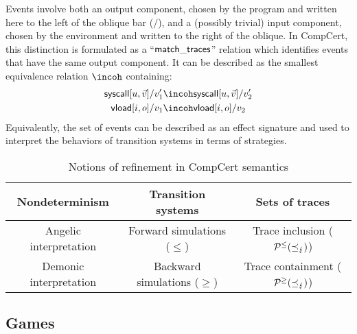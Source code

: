 \documentclass[sigplan,10pt,authordraft]{acmart}
\begin{document}
Events involve both an output component,
chosen by the program and
written here to the left of the oblique bar ($/$),
and a (possibly trivial) input component,
chosen by the environment and written to the right of the oblique.
In CompCert,
this distinction is formulated as a ``$ \mathsf{match\_traces} $'' relation
which identifies events that have the same output component.
It can be described as the smallest equivalence relation $\incoh$
containing:
\begin{align*}
  \kw{syscall}[u, \vec{v}]/v_1' &\incoh
  \kw{syscall}[u, \vec{v}]/v_2'
  \\
  \kw{vload}[i, o]/v_1 &\incoh
  \kw{vload}[i, o]/v_2
\end{align*}
Equivalently,
the set of events can be described as an effect signature
and used to interpret the behaviors of transition systems
in terms of strategies.


\begin{table*} %
  \caption{Notions of refinement in CompCert semantics}
  \label{tbl:compcertref}
  \centering
  \begin{tabular}{ccc}
    \hline
    Nondeterminism
      & Transition systems
      & Sets of traces \\
    \hline
    Angelic interpretation
      & Forward simulations ($\le$)
      & Trace inclusion ($\mathcal{P}^\le(\preceq_\lightning)$) \\
    Demonic interpretation
      & Backward simulations ($\ge$)
      & Trace containment ($\mathcal{P}^\ge(\preceq_\lightning)$) \\
    \hline
  \end{tabular}
\end{table*}

\subsection{Games} \label{sec:sem:games} %
\end{document}
